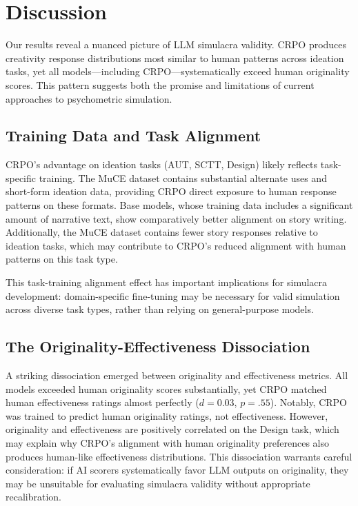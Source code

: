 \documentclass[11pt,twocolumn]{article}
\begin{document}
\section{Discussion}

Our results reveal a nuanced picture of LLM simulacra validity. CRPO produces creativity response distributions most similar to human patterns across ideation tasks, yet all models---including CRPO---systematically exceed human originality scores. This pattern suggests both the promise and limitations of current approaches to psychometric simulation.

\subsection{Training Data and Task Alignment}

CRPO's advantage on ideation tasks (AUT, SCTT, Design) likely reflects task-specific training. The MuCE dataset contains substantial alternate uses and short-form ideation data, providing CRPO direct exposure to human response patterns on these formats. Base models, whose training data includes a significant amount of narrative text, show comparatively better alignment on story writing. Additionally, the MuCE dataset contains fewer story responses relative to ideation tasks, which may contribute to CRPO's reduced alignment with human patterns on this task type.

This task-training alignment effect has important implications for simulacra development: domain-specific fine-tuning may be necessary for valid simulation across diverse task types, rather than relying on general-purpose models.

\subsection{The Originality-Effectiveness Dissociation}

A striking dissociation emerged between originality and effectiveness metrics. All models exceeded human originality scores substantially, yet CRPO matched human effectiveness ratings almost perfectly ($d = 0.03$, $p = .55$). Notably, CRPO was trained to predict human originality ratings, not effectiveness. However, originality and effectiveness are positively correlated on the Design task, which may explain why CRPO's alignment with human originality preferences also produces human-like effectiveness distributions. This dissociation warrants careful consideration: if AI scorers systematically favor LLM outputs on originality, they may be unsuitable for evaluating simulacra validity without appropriate recalibration.
\end{document}

